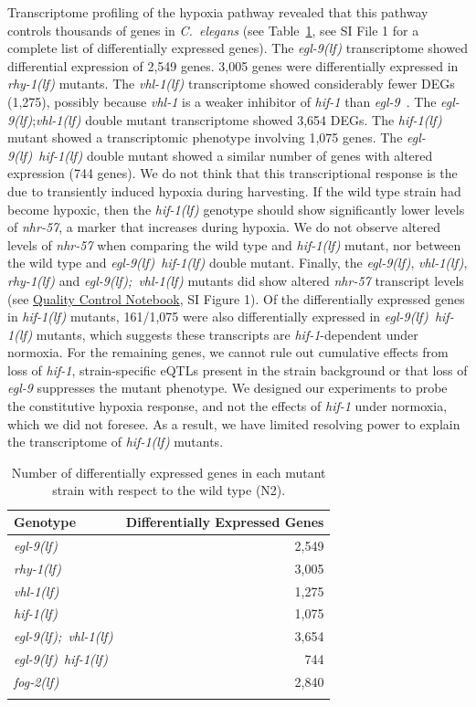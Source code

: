 \documentclass[9pt,twocolumn,twoside]{pnas-new}
\newcommand{\cel}{\emph{C.~elegans}}
\newcommand{\gene}[1]{\mbox{\emph{#1}}}
\newcommand{\fog}{\gene{fog-2(lf)}}
\newcommand{\egl}{\gene{egl-9(lf)}}
\newcommand{\rhy}{\gene{rhy-1(lf)}}
\newcommand{\vhl}{\gene{vhl-1(lf)}}
\newcommand{\eglvhl}{\gene{egl-9(lf); vhl-1(lf)}}
\newcommand{\eglhif}{\gene{egl-9(lf) hif-1(lf)}}
\newcommand{\hif}{\gene{hif-1(lf)}}
\newcommand{\egln}{2,549}
\newcommand{\rhyn}{3,005}
\newcommand{\vhln}{1,275}
\newcommand{\eglvhln}{3,654}
\newcommand{\hifn}{1,075}
\newcommand{\eglhifn}{744}
\newcommand{\fogn}{2,840}
\begin{document}
Transcriptome profiling of the hypoxia pathway revealed that this pathway
controls thousands of genes in \cel{} (see Table~\ref{tab:genes}, see
SI File 1 for a complete list of differentially expressed genes).
The \egl{}
transcriptome showed differential expression of \egln{} genes. \rhyn{} genes
were differentially expressed in \rhy{} mutants. The \vhl{} transcriptome showed
considerably fewer DEGs (\vhln{}), possibly because \gene{vhl-1} is a weaker
inhibitor of \gene{hif-1} than \gene{egl-9}~\cite{Shao2009}. The \egl{};\vhl{}
double mutant transcriptome showed \eglvhln{} DEGs. The \hif{} mutant showed a
transcriptomic phenotype involving \hifn{} genes. The \eglhif{} double mutant
showed a similar number of genes with altered expression (\eglhifn{} genes).
We do not think that this transcriptional response is the due to transiently
induced hypoxia during harvesting. If the wild type strain had become hypoxic,
then the \hif{} genotype should show significantly lower levels of
\gene{nhr-57}, a marker that increases during hypoxia. We do not observe altered
levels of \gene{nhr-57} when comparing the wild type and \hif{} mutant, nor
between the wild type and \eglhif{} double mutant. Finally, the \egl{}, \vhl{},
\rhy{} and \eglvhl{} mutants did show altered \gene{nhr-57} transcript levels
(see
\href{https://wormlabcaltech.github.io/mprsq/analysis_notebooks/5_quality_check.html}{
Quality Control Notebook}, SI Figure 1). Of the differentially expressed genes
in \hif{} mutants, 161/\hifn{} were also differentially expressed in \eglhif{}
mutants, which suggests these transcripts are \gene{hif-1}-dependent under
normoxia. For the remaining genes, we cannot rule out cumulative effects from
loss of \gene{hif-1}, strain-specific eQTLs present in the strain background or
that loss of \gene{egl-9} suppresses the mutant phenotype. We designed our
experiments to probe the constitutive hypoxia response, and not the effects of
\gene{hif-1} under normoxia, which we did not foresee. As a result, we have
limited resolving power to explain the transcriptome of \hif{} mutants.
\color{black}

\begin{table}[tbhp]
  \centering
  \begin{tabular}{lr}
    \toprule{}
    Genotype & Differentially Expressed Genes\\
    \midrule{}\egl{} & \egln{}\\
    \rhy{} & \rhyn{}\\
    \vhl{} & \vhln{}\\
    \hif{} & \hifn{}\\
    \eglvhl{} & \eglvhln{}\\
    \eglhif{} & \eglhifn{}\\
    \fog{} & \fogn{}\\
    \bottomrule{}
  \end{tabular}
  \caption{Number of differentially expressed genes in each mutant strain with
  respect to the wild type (N2).}
\label{tab:genes}
\end{table}
\end{document}
